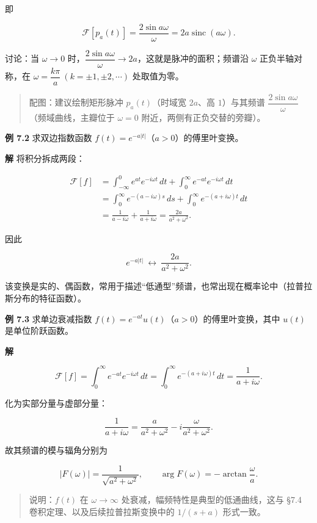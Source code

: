 即

\[
\mathcal F[p_a(t)]=\frac{2\sin a\omega}{\omega}=2a\operatorname{sinc}(a\omega).
\]

讨论：当 \(\omega\to 0\)
时，\(\dfrac{2\sin a\omega}{\omega}\to 2a\)，这就是脉冲的面积；频谱沿
\(\omega\) 正负半轴对称，在
\(\omega=\dfrac{k\pi}{a}\ (k=\pm1,\pm2,\cdots)\) 处取值为零。

\begin{quote}
配图：建议绘制矩形脉冲 \(p_a(t)\)（时域宽 \(2a\)、高 \(1\)）与其频谱
\(\dfrac{2\sin a\omega}{\omega}\)（频域曲线，主瓣位于 \(\omega=0\)
附近，两侧有正负交替的旁瓣）。
\end{quote}

\textbf{例 7.2} 求双边指数函数
\(f(t)=e^{-a|t|}\)（\(a>0\)）的傅里叶变换。

\textbf{解} 将积分拆成两段：

\[
\begin{aligned}
\mathcal F[f]
&=\int_{-\infty}^{0}e^{at}e^{-i\omega t}\,dt+\int_{0}^{\infty}e^{-at}e^{-i\omega t}\,dt\\
&=\int_{0}^{\infty}e^{-(a-i\omega)s}\,ds+\int_{0}^{\infty}e^{-(a+i\omega)t}\,dt\\
&=\frac{1}{a-i\omega}+\frac{1}{a+i\omega}
=\frac{2a}{a^2+\omega^2}.
\end{aligned}
\]

因此

\[
e^{-a|t|}\ \longleftrightarrow\ \frac{2a}{a^2+\omega^2}.
\]

该变换是实的、偶函数，常用于描述``低通型''频谱，也常出现在概率论中（拉普拉斯分布的特征函数）。

\textbf{例 7.3} 求单边衰减指数
\(f(t)=e^{-at}u(t)\)（\(a>0\)）的傅里叶变换，其中 \(u(t)\)
是单位阶跃函数。

\textbf{解}

\[
\mathcal F[f]=\int_{0}^{\infty}e^{-at}e^{-i\omega t}\,dt
=\int_{0}^{\infty}e^{-(a+i\omega)t}\,dt
=\frac{1}{a+i\omega}.
\]

化为实部分量与虚部分量：

\[
\frac{1}{a+i\omega}=\frac{a}{a^2+\omega^2}-i\frac{\omega}{a^2+\omega^2}.
\]

故其频谱的模与辐角分别为

\[
|F(\omega)|=\frac{1}{\sqrt{a^2+\omega^2}},\qquad
\arg F(\omega)=-\arctan\frac{\omega}{a}.
\]

\begin{quote}
说明：\(f(t)\) 在 \(\omega\to\infty\)
处衰减，幅频特性是典型的低通曲线，这与 §7.4
卷积定理、以及后续拉普拉斯变换中的 \(1/(s+a)\) 形式一致。
\end{quote}

